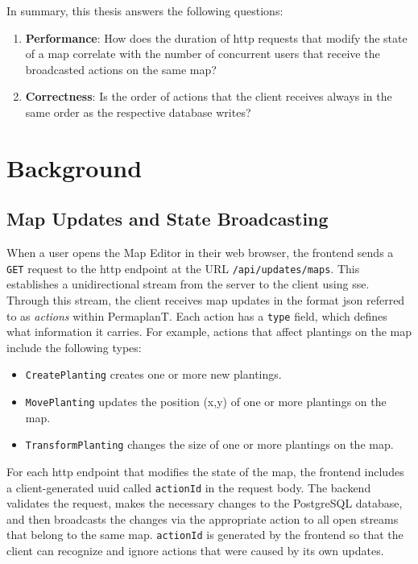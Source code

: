 \documentclass[final,oneside]{vutinfth}
\newcommand{\urlsnippet}[1]{\lstinline[language=url]{#1}}
\begin{document}
In summary, this thesis answers the following questions:
\begin{enumerate}
  \item \textbf{Performance}: How does the duration of \gls{http} requests that modify the state of a map correlate with the number of concurrent users that receive the broadcasted actions on the same map?
  \item \textbf{Correctness}: Is the order of actions that the client receives always in the same order as the respective database writes? 
\end{enumerate}

\chapter{Background}

\section{Map Updates and State Broadcasting}

When a user opens the Map Editor in their web browser, the frontend sends a \texttt{GET} request to the \gls{http} endpoint at the URL \urlsnippet{/api/updates/maps}.
This establishes a unidirectional stream from the server to the client using \gls{sse}.
Through this stream, the client receives map updates in the format \gls{json} referred to as \emph{actions} within PermaplanT.
Each action has a \texttt{type} field, which defines what information it carries.
For example, actions that affect plantings on the map include the following types:
\begin{itemize}
    \item \texttt{CreatePlanting} creates one or more new plantings.
    \item \texttt{MovePlanting} updates the position (x,y) of one or more plantings on the map.
    \item\texttt{TransformPlanting} changes the size of one or more plantings on the map.
\end{itemize}

For each \gls{http} endpoint that modifies the state of the map, the frontend includes a client-generated \gls{uuid} called \texttt{actionId} in the request body.
The backend validates the request, makes the necessary changes to the PostgreSQL database, and then broadcasts the changes via the appropriate action to all open streams that belong to the same map.
\texttt{actionId} is generated by the frontend so that the client can recognize and ignore actions that were caused by its own updates.
\end{document}
